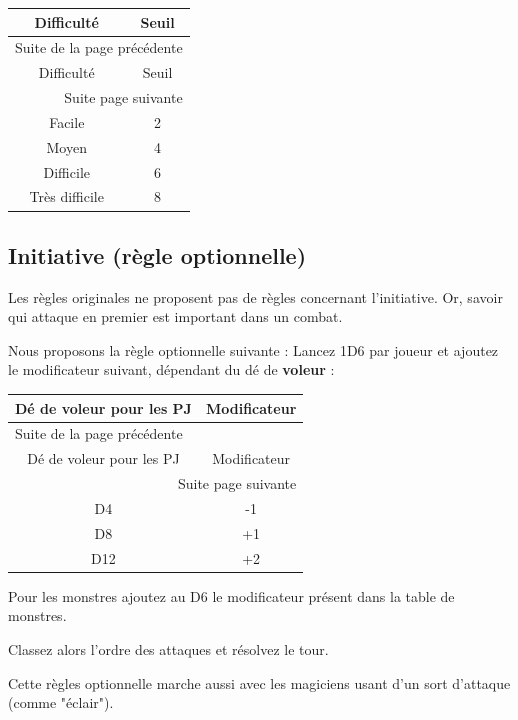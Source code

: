 \documentclass[a4paper, 11pt, twoside]{article}
\begin{document}
\begin{longtable}{c|c}
Difficulté & Seuil\\
\hline
\endfirsthead
\multicolumn{2}{l}{Suite de la page précédente} \\
\hline

Difficulté & Seuil \\

\hline
\endhead
\hline\multicolumn{2}{r}{Suite page suivante} \\
\endfoot
\endlastfoot
\hline
Facile & 2\\
Moyen & 4\\
Difficile & 6\\
Très difficile & 8\\
\end{longtable}

\subsection{Initiative (règle optionnelle)}
\label{sec:orgd72b511}

Les règles originales ne proposent pas de règles concernant l'initiative. Or, savoir qui attaque en premier est important dans un combat.

Nous proposons la règle optionnelle suivante : Lancez 1D6 par joueur et ajoutez le modificateur suivant, dépendant du dé de \textbf{voleur} :

\begin{longtable}{c|c}
Dé de voleur pour les PJ & Modificateur\\
\hline
\endfirsthead
\multicolumn{2}{l}{Suite de la page précédente} \\
\hline

Dé de voleur pour les PJ & Modificateur \\

\hline
\endhead
\hline\multicolumn{2}{r}{Suite page suivante} \\
\endfoot
\endlastfoot
\hline
D4 & -1\\
D8 & +1\\
D12 & +2\\
\end{longtable}

Pour les monstres ajoutez au D6 le modificateur présent dans la table de monstres.

Classez alors l'ordre des attaques et résolvez le tour.

Cette règles optionnelle marche aussi avec les magiciens usant d'un sort d'attaque (comme "éclair").
\end{document}

